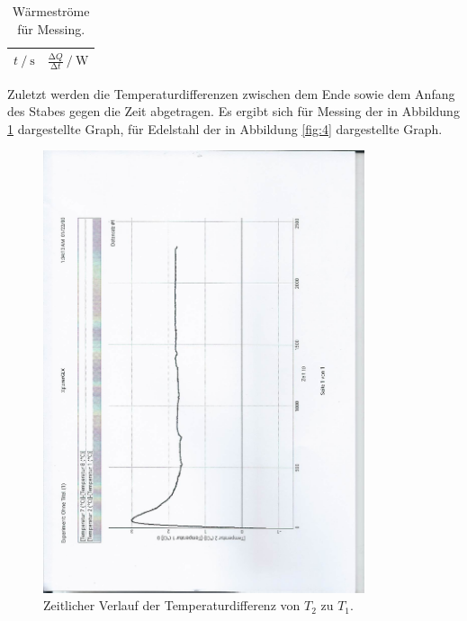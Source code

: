 \begin{table}
  \centering
  \caption{Wärmeströme für Messing.}
  \label{tab:2}
  \begin{tabular}{c c}
    \toprule
    {$t \:/\: \si{\second}$} & {$\frac{\increment{Q}}{\increment{t}} \:/\: \si{\watt}$}\\
    \midrule
    
    \bottomrule
  \end{tabular}
\end{table}

Zuletzt werden die Temperaturdifferenzen zwischen dem Ende sowie dem Anfang des Stabes gegen die Zeit abgetragen.
Es ergibt sich für Messing der in Abbildung \ref{fig:3} dargestellte Graph, für Edelstahl der in Abbildung \ref{fig:4} dargestellte Graph.
\begin{figure}
  \centering
  \includegraphics[height=13cm, angle=270]{scan-4.jpg}
  \caption{Zeitlicher Verlauf der Temperaturdifferenz von $T_2$ zu $T_1$.}
  \label{fig:3}
\end{figure}

